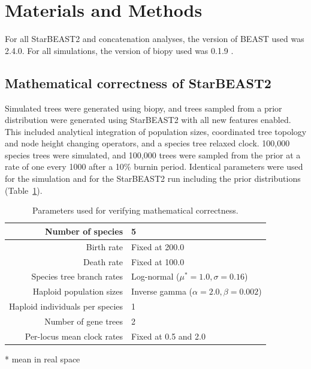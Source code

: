 \documentclass[12pt]{article}
\begin{document}
\section*{Materials and Methods}

For all StarBEAST2 and concatenation analyses, the version of BEAST used was
2.4.0. For all simulations, the version of biopy used was 0.1.9 \citep{biopy}.

\subsection*{Mathematical correctness of StarBEAST2}

Simulated trees were generated using biopy, and trees sampled from
a prior distribution were generated using StarBEAST2 with all new features
enabled. This included analytical integration of population sizes, coordinated
tree topology and node height changing operators, and a species tree relaxed
clock. 100,000 species trees were simulated, and 100,000 trees were sampled from
the prior at a rate of one every 1000 after a 10\% burnin period. Identical
parameters were used for the simulation and for the StarBEAST2 run including the
prior distributions (Table~\ref{tab:correctParameters}).

\begin{table}[htb!]
\centering
\caption{Parameters used for verifying mathematical correctness.}
\label{tab:correctParameters}
\begin{threeparttable}
\begin{adjustbox}{center}
\begin{tabular}{|r|l|}
\hline
Number of species & 5\tabularnewline
\hline
Birth rate & Fixed at 200.0\tabularnewline
\hline
Death rate & Fixed at 100.0\tabularnewline
\hline
Species tree branch rates & Log-normal ($\mu^* = 1.0, \sigma = 0.16$)\tabularnewline
\hline
Haploid population sizes & Inverse gamma ($\alpha = 2.0, \beta = 0.002$)\tabularnewline
\hline
Haploid individuals per species & 1\tabularnewline
\hline
Number of gene trees & 2\tabularnewline
\hline
Per-locus mean clock rates & Fixed at 0.5 and 2.0\tabularnewline
\hline
\end{tabular}
\end{adjustbox}
\begin{tablenotes}
\small
\item \hspace{2cm} * mean in real space
\end{tablenotes}
\end{threeparttable}
\end{table}
\end{document}
